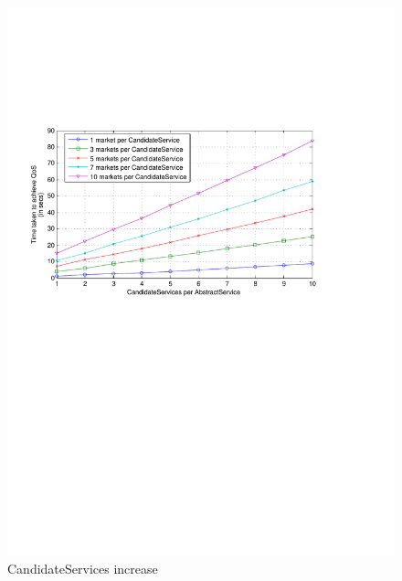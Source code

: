 \documentclass[10pt,journal,compsoc]{IEEEtran}
\begin{document}
\begin{figure}[htbp]
  \centering
  \includegraphics[clip, trim=0cm 14cm 3cm 6cm, scale=0.4]{graphs/1_3_5_7_10_mkts_per_svc_scaling.pdf}
  \caption{CandidateServices increase\label{fig:mkt_per_svc}}
\end{figure}
\end{document}
